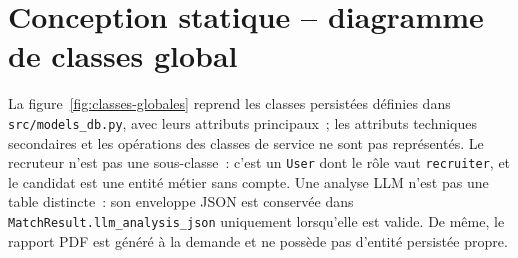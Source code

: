 \section{Conception statique -- diagramme de classes global}
La figure~\ref{fig:classes-globales} reprend les classes persistées définies dans \texttt{src/models\_db.py}, avec leurs attributs principaux~; les attributs techniques secondaires et les opérations des classes de service ne sont pas représentés. Le recruteur n'est pas une sous-classe~: c'est un \texttt{User} dont le rôle vaut \texttt{recruiter}, et le candidat est une entité métier sans compte. Une analyse LLM n'est pas une table distincte~: son enveloppe JSON est conservée dans \texttt{MatchResult.llm\_analysis\_json} uniquement lorsqu'elle est valide. De même, le rapport PDF est généré à la demande et ne possède pas d'entité persistée propre.

